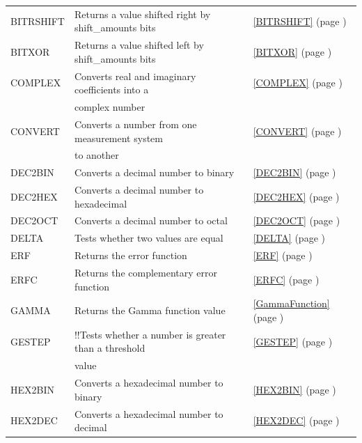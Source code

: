\begin{center}
\begin{longtable}{l l l }
		BITRSHIFT &  Returns a value shifted right by shift\_amounts bits &  \ref{BITRSHIFT} (page \pageref{BITRSHIFT}) \index{Spreadsheet Functions!BITRSHIFT} \\		
		BITXOR & Returns a value shifted left by shift\_amounts bits &  \ref{BITXOR} (page \pageref{BITXOR}) \index{Spreadsheet Functions!BITXOR} \\		
		COMPLEX & Converts real and imaginary coefficients into a &  \ref{COMPLEX} (page \pageref{COMPLEX}) \index{Spreadsheet Functions!COMPLEX} \\
		& complex number &   \\
		CONVERT & Converts a number from one measurement system &  \ref{CONVERT} (page \pageref{CONVERT}) \index{Spreadsheet Functions!CONVERT} \\
		& to another &   \\
		DEC2BIN & Converts a decimal number to binary &  \ref{DEC2BIN} (page \pageref{DEC2BIN}) \index{Spreadsheet Functions!DEC2BIN} \\
		DEC2HEX & Converts a decimal number to hexadecimal &  \ref{DEC2HEX} (page \pageref{DEC2HEX}) \index{Spreadsheet Functions!DEC2HEX} \\
		DEC2OCT & Converts a decimal number to octal &  \ref{DEC2OCT} (page \pageref{DEC2OCT}) \index{Spreadsheet Functions!DEC2OCT} \\
		DELTA & Tests whether two values are equal &  \ref{DELTA} (page \pageref{DELTA}) \index{Spreadsheet Functions!DELTA} \\
		ERF   & Returns the error function &  \ref{ERF} (page \pageref{ERF}) \index{Spreadsheet Functions!ERF} \\
		ERFC  & Returns the complementary error function &  \ref{ERFC} (page \pageref{ERFC}) \index{Spreadsheet Functions!ERFC} \\
		GAMMA   & Returns the Gamma function value &  \ref{GammaFunction} (page \pageref{GammaFunction}) \index{Spreadsheet Functions!GAMMA} \\
		GESTEP & !!Tests whether a number is greater than a threshold &  \ref{GESTEP} (page \pageref{GESTEP}) \index{Spreadsheet Functions!GESTEP} \\
		& value &   \\
		HEX2BIN & Converts a hexadecimal number to binary &  \ref{HEX2BIN} (page \pageref{HEX2BIN}) \index{Spreadsheet Functions!HEX2BIN} \\
		HEX2DEC & Converts a hexadecimal number to decimal &  \ref{HEX2DEC} (page \pageref{HEX2DEC}) \index{Spreadsheet Functions!HEX2DEC} \\

\end{longtable}
\end{center}
